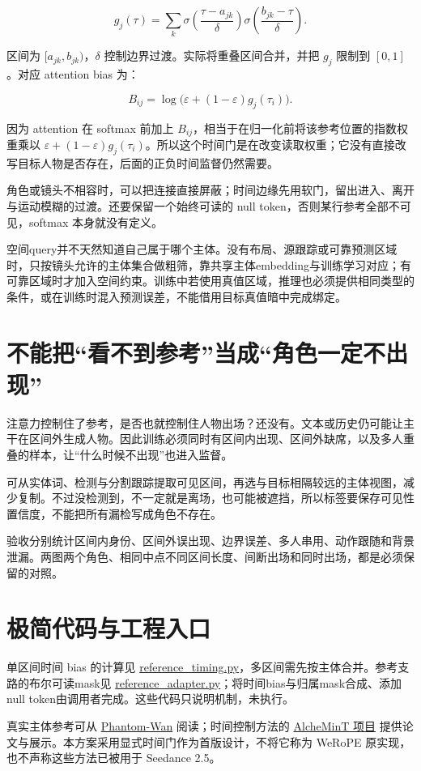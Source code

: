 \[
g_j(\tau)=\sum_k
\sigma\!\left(\frac{\tau-a_{jk}}{\delta}\right)
\sigma\!\left(\frac{b_{jk}-\tau}{\delta}\right).
\]

区间为 \([a_{jk},b_{jk})\)，\(\delta\) 控制边界过渡。实际将重叠区间合并，并把 \(g_j\) 限制到 \([0,1]\)。对应 attention bias 为：

\[
B_{ij}=\log\bigl(\varepsilon+(1-\varepsilon)g_j(\tau_i)\bigr).
\]

因为 attention 在 softmax 前加上 \(B_{ij}\)，相当于在归一化前将该参考位置的指数权重乘以 \(\varepsilon+(1-\varepsilon)g_j(\tau_i)\)。所以这个时间门是在改变读取权重；它没有直接改写目标人物是否存在，后面的正负时间监督仍然需要。

角色或镜头不相容时，可以把连接直接屏蔽；时间边缘先用软门，留出进入、离开与运动模糊的过渡。还要保留一个始终可读的 null token，否则某行参考全部不可见，softmax 本身就没有定义。

空间query并不天然知道自己属于哪个主体。没有布局、源跟踪或可靠预测区域时，只按镜头允许的主体集合做粗筛，靠共享主体embedding与训练学习对应；有可靠区域时才加入空间约束。训练中若使用真值区域，推理也必须提供相同类型的条件，或在训练时混入预测误差，不能借用目标真值暗中完成绑定。

\section{不能把``看不到参考''当成``角色一定不出现''}\label{seedance-m16-ux4e0dux80fdux628aux770bux4e0dux5230ux53c2ux8003ux5f53ux6210ux89d2ux8272ux4e00ux5b9aux4e0dux51faux73b0}

注意力控制住了参考，是否也就控制住人物出场？还没有。文本或历史仍可能让主干在区间外生成人物。因此训练必须同时有区间内出现、区间外缺席，以及多人重叠的样本，让“什么时候不出现”也进入监督。

可从实体词、检测与分割跟踪提取可见区间，再选与目标相隔较远的主体视图，减少复制。不过没检测到，不一定就是离场，也可能被遮挡，所以标签要保存可见性置信度，不能把所有漏检写成角色不存在。

验收分别统计区间内身份、区间外误出现、边界误差、多人串用、动作跟随和背景泄漏。两图两个角色、相同中点不同区间长度、间断出场和同时出场，都是必须保留的对照。

\section{极简代码与工程入口}\label{seedance-m16-ux6781ux7b80ux4ee3ux7801ux4e0eux5de5ux7a0bux5165ux53e3}

单区间时间 bias 的计算见 \hyperref[code-reference-timing]{reference\_timing.py}，多区间需先按主体合并。参考支路的布尔可读mask见 \hyperref[code-reference-adapter]{reference\_adapter.py}；将时间bias与归属mask合成、添加null token由调用者完成。这些代码只说明机制，未执行。

真实主体参考可从 \href{https://github.com/Phantom-video/Phantom}{Phantom-Wan} 阅读；时间控制方法的 \href{https://snap-research.github.io/Video-AlcheMinT/}{AlcheMinT 项目} 提供论文与展示。本方案采用显式时间门作为首版设计，不将它称为 WeRoPE 原实现，也不声称这些方法已被用于 Seedance 2.5。
